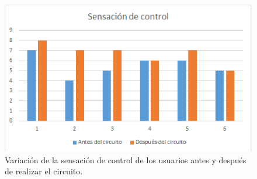 \documentclass[twoside, 11pt]{epstfg}
\begin{document}
\begin{itemize}
\begin{figure}[H]
	\centerline{
		\mbox{\includegraphics[width=.85\textwidth]{images/SensacionControl.png}}
	}
	\caption{Variación de la sensación de control de los usuarios antes y después de realizar el circuito.}
	\label{SensacionControl}
\end{figure}



\end{itemize}
%
%
%
%
%
%
%
%
\end{document}

